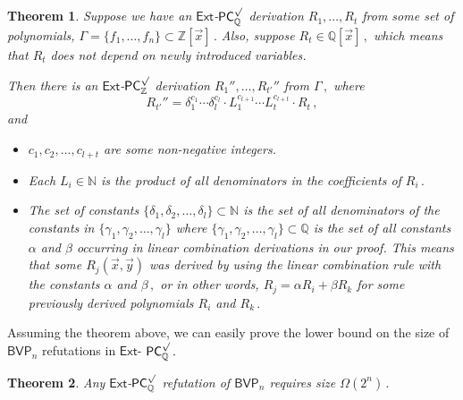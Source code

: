 \documentclass[11pt]{article}
\newtheorem{theorem}{Theorem}[section]
\newcommand{\Q}{{\mathbb Q}}
\newcommand{\Z}{{\mathbb Z}}
\begin{document}
\begin{theorem}\label{transaltion-from-z-to-q}
Suppose we have an $\mathsf{Ext}$-$\mathsf{PC}^{\surd}_{\Q}$ derivation
%
%
$R_1, \ldots, R_t$  %
%
%
from some set of polynomials, %
$\Gamma = \{f_1, \ldots, f_n\} \subset \Z[\vec x]\,.$ %
%
%
Also, suppose %
$R_t \in \Q[\vec x]\,,$ %
 which means that $R_t$ does not depend on newly
introduced variables.

Then there is an $\mathsf{Ext}$-$\mathsf{PC}^{\surd}_{\Z}$ derivation
%
$R_1'', \ldots, R_{t'}''$ %
 from  %
$\Gamma\,,$ %
 where
$$
%
R_{t'}'' = \delta_1^{c_{1}} \cdots \delta_l^{c_{l}} \cdot  L_1^{c_{l + 1}} \cdots L_t^{c_{l + t}}  \cdot R_t\,, %
$$ and
\begin{itemize}
    \item $c_1, c_2, \ldots, c_{l + t}$ are some non-negative integers.  
    \item Each $L_i \in \mathbb{N}$ is the product of all denominators in the coefficients of %
$R_i\,.$ %
    \item The set of constants $\{\delta_1, \delta_2, \ldots, \delta_l\} \subset \mathbb{N}$ is the set of all denominators of the constants in $\{\gamma_1, \gamma_2, \ldots, \gamma_l\}$ where  $\{\gamma_1, \gamma_2, \ldots, \gamma_l\} \subset \Q$ is the set of all constants $\alpha$ and $\beta$ occurring in linear combination derivations in our proof. This means that some $R_j(\vec x, \vec y)$ was derived by using the linear combination rule with the constants $\alpha$ and %
$\beta\,,$ %
 or in other words, $R_j = \alpha R_i + \beta R_k$ for some previously derived polynomials $R_i$ and %
$R_k\,.$ %
\end{itemize}


\end{theorem}

%
Assuming the theorem above, we can easily prove the lower bound on the size of $\mathsf{BVP}_n$ refutations in $\mathsf{Ext}$-%
$\mathsf{PC}^{\surd}_{\Q}\,.$ %
%



\begin{theorem}\label{lower bound q}
Any $\mathsf{Ext}$-$\mathsf{PC}^{\surd}_{\Q}$ refutation of $\mathsf{BVP}_n$  requires size %
$\Omega(2^n)\,.$ %
\end{theorem} 
\end{document}
